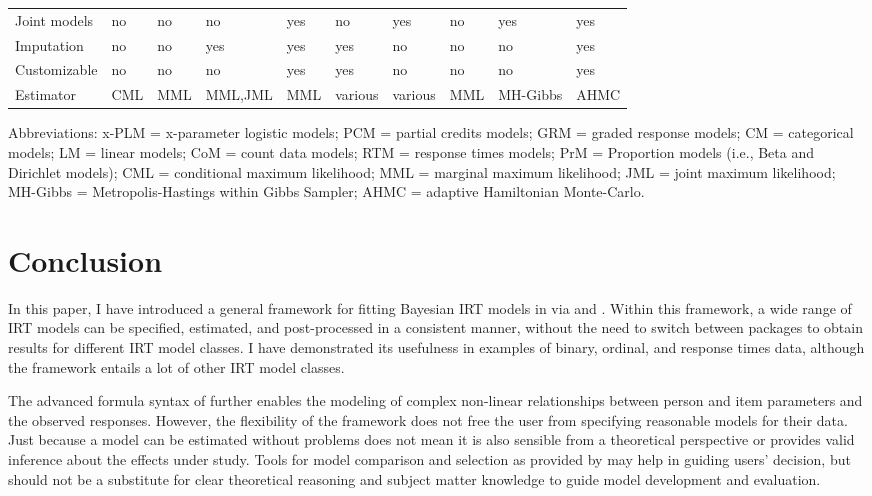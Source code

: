 \documentclass[
]{jss}
\begin{document}
\begin{CodeChunk}
\begin{table}
\begin{threeparttable}
{\begin{tabular}[t]{llllllllll}
\addlinespace
Joint models & no & no & no & yes & no & yes & no & yes & yes\\
Imputation & no & no & yes & yes & yes & no & no & no & yes\\
Customizable & no & no & no & yes & yes & no & no & no & yes\\
Estimator & CML & MML & MML,JML & MML & various & various & MML & MH-Gibbs & AHMC\\
\bottomrule
\end{tabular}}
\begin{tablenotes}
\item \small Abbreviations: x-PLM = x-parameter logistic models; PCM = partial credits models; GRM = \newline graded response models; CM = categorical models; LM = linear models; CoM = count data \newline  models; RTM = response times models; PrM =  Proportion models (i.e., Beta and Dirichlet models); \newline  CML = conditional maximum likelihood; MML = marginal maximum likelihood; JML = joint \newline maximum likelihood; MH-Gibbs = Metropolis-Hastings within Gibbs Sampler; AHMC = adaptive \newline Hamiltonian Monte-Carlo.
\end{tablenotes}
\end{threeparttable}
\end{table}

\end{CodeChunk}

\hypertarget{conclusion}{%
\section{Conclusion}\label{conclusion}}

In this paper, I have introduced a general framework for fitting
Bayesian IRT models in  via  and .
Within this framework, a wide range of IRT models can be specified,
estimated, and post-processed in a consistent manner, without the need
to switch between packages to obtain results for different IRT model
classes. I have demonstrated its usefulness in examples of binary,
ordinal, and response times data, although the framework entails a lot
of other IRT model classes.

The advanced formula syntax of  further enables the modeling
of complex non-linear relationships between person and item parameters
and the observed responses. However, the flexibility of the framework
does not free the user from specifying reasonable models for their data.
Just because a model can be estimated without problems does not mean it
is also sensible from a theoretical perspective or provides valid
inference about the effects under study. Tools for model comparison and
selection as provided by  may help in guiding users' decision,
but should not be a substitute for clear theoretical reasoning and
subject matter knowledge to guide model development and evaluation.
\end{document}
